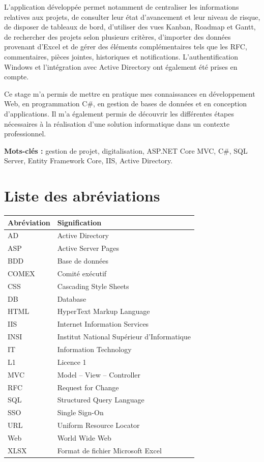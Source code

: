 \documentclass[12pt,a4paper,oneside]{report}
\begin{document}
L'application développée permet notamment de centraliser les informations relatives aux projets, de consulter leur état d'avancement et leur niveau de risque, de disposer de tableaux de bord, d'utiliser des vues Kanban, Roadmap et Gantt, de rechercher des projets selon plusieurs critères, d'importer des données provenant d'Excel et de gérer des éléments complémentaires tels que les RFC, commentaires, pièces jointes, historiques et notifications. L'authentification Windows et l'intégration avec Active Directory ont également été prises en compte.

Ce stage m'a permis de mettre en pratique mes connaissances en développement Web, en programmation C\#, en gestion de bases de données et en conception d'applications. Il m'a également permis de découvrir les différentes étapes nécessaires à la réalisation d'une solution informatique dans un contexte professionnel.

\textbf{Mots-clés :} gestion de projet, digitalisation, ASP.NET Core MVC, C\#, SQL Server, Entity Framework Core, IIS, Active Directory.

\chapter*{Liste des abréviations}

\begin{longtable}{p{4cm}p{10cm}}
\toprule
\textbf{Abréviation} & \textbf{Signification}\\
\midrule
AD & Active Directory\\
ASP & Active Server Pages\\
BDD & Base de données\\
COMEX & Comité exécutif\\
CSS & Cascading Style Sheets\\
DB & Database\\
HTML & HyperText Markup Language\\
IIS & Internet Information Services\\
INSI & Institut National Supérieur d'Informatique\\
IT & Information Technology\\
L1 & Licence 1\\
MVC & Model -- View -- Controller\\
RFC & Request for Change\\
SQL & Structured Query Language\\
SSO & Single Sign-On\\
URL & Uniform Resource Locator\\
Web & World Wide Web\\
XLSX & Format de fichier Microsoft Excel\\
\bottomrule
\end{longtable}
\end{document}
